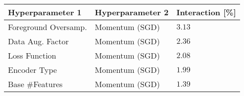 \begin{tabular}{lll}
\toprule
Hyperparameter 1 & Hyperparameter 2 & Interaction [\%] \\
\midrule
Foreground Oversamp. & Momentum (SGD) & $3.13$ \\
Data Aug. Factor & Momentum (SGD) & $2.36$ \\
Loss Function & Momentum (SGD) & $2.08$ \\
Encoder Type & Momentum (SGD) & $1.99$ \\
Base #Features & Momentum (SGD) & $1.39$ \\
\bottomrule
\end{tabular}
